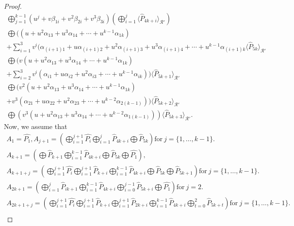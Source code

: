 \documentclass[10pt,a4paper]{amsart}
\begin{document}
\begin{proof}
\begin{gather*}
            \bigoplus_{j=1}^{k-1}  (u^j+ v\beta_{1i} + v^2\beta_{2i} + v^3\beta_{3i}) \left( \bigoplus_{i=1}^{j} \langle \hat{P}_{4k+i} \rangle_{\mathcal{R}'} \right)
            \\ \bigoplus  ((u + u^2\alpha_{13} + u^3\alpha_{14} + \cdots + u^{k-1}\alpha_{1k})
           \\ + \sum_{i=1}^{3} v^i( \alpha_{(i+1)1} + u\alpha_{(i+1)2} + u^2\alpha_{(i+1)3} + u^3\alpha_{(i+1)4} + \cdots + u^{k-1}\alpha_{(i+1)k} \langle \hat{P}_{5k} \rangle_{\mathcal{R}'} \\
           \bigoplus   (v(u + u^2\alpha_{13} + u^3\alpha_{14} + \cdots + u^{k-1}\alpha_{1k})
           \\ + \sum_{i=2}^{3} v^i( \alpha_{i1} + u\alpha_{i2} + u^2\alpha_{i3} +  \cdots + u^{k-1}\alpha_{ik} ))\langle \hat{P}_{5k+1} \rangle_{\mathcal{R}'} \\
           \bigoplus (v^2(u + u^2\alpha_{13} + u^3\alpha_{14} + \cdots + u^{k-1}\alpha_{1k})
     \\ + v^3( \alpha_{21} + u\alpha_{22} + u^2\alpha_{23} + \cdots + u^{k-2}\alpha_{2(k-1)})) \langle \hat{P}_{5k+2} \rangle_{\mathcal{R}'} \\
           \bigoplus  (v^3(u + u^2\alpha_{13} + u^3\alpha_{14} + \cdots + u^{k-2}\alpha_{1(k-1)})) \langle \hat{P}_{5k+3} \rangle_{\mathcal{R}'}.
           \end{gather*}
    Now, we assume that
    \allowdisplaybreaks
    \begin{gather*}
        A_1 = \hat{P_{1}}, A_{j+1} = \left( \bigoplus_{i=1}^{j+1}  \hat{P_i}  \bigoplus_{i=1}^{j}  \hat{P}_{4k+i}  \bigoplus  \hat{P}_{5k}   \right) \text{for} ~ j = \{1,\dots,k-1\}. \\
         A_{k+1} = \left( \bigoplus  \hat{P}_{k+1}  \bigoplus_{i=1}^{k-1}  \hat{P}_{4k+i}  \bigoplus  \hat{P}_{5k}  \bigoplus  \hat{P_{1}}   \right), \\
         A_{k+1+j} = \left( \bigoplus_{i=1}^{j+1}  \hat{P_{i}}  \bigoplus_{i=1}^{j+1}  \hat{P}_{k+i}  \bigoplus_{i=1}^{k-1}  \hat{P}_{4k+i}  \bigoplus  \hat{P}_{5k}  \bigoplus  \hat{P}_{5k+1}   \right) \text{for} ~ j = \{1,\dots,k-1\}.  \\
         A_{2k+1} =   \left( \bigoplus_{i=1}^{j}  \hat{P}_{ik+1}  \bigoplus_{i=1}^{k-1}  \hat{P}_{4k+i}  \bigoplus_{i=0}^{j-1}  \hat{P}_{5k+i}  \bigoplus  \hat{P_{1}}   \right) \text{for} ~ j =2. \\
         A_{2k+1+j} = \left( \bigoplus_{i=1}^{j+1}  \hat{P_{i}}  \bigoplus_{i=1}^{j+1}  \hat{P}_{k+i}   \bigoplus_{i=1}^{j+1}  \hat{P}_{2k+i} \bigoplus_{i=1}^{k-1}  \hat{P}_{4k+i}  \bigoplus_{t=0}^{2}  \hat{P}_{5k+t}    \right) \text{for} ~ j = \{1,\dots,k-1\}. \\

\end{gather*}
\end{proof}
\end{document}
